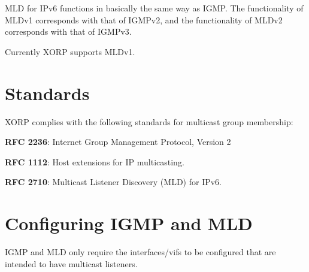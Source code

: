 MLD for IPv6 functions in basically the same way as IGMP.  The
functionality of MLDv1 corresponds with that of IGMPv2, and the
functionality of MLDv2 corresponds with that of IGMPv3.  

Currently XORP supports MLDv1.

\vfill\eject
\section{Standards}
XORP complies with the following standards for multicast group membership:
\begin{description}
\item{\bf RFC 2236}: Internet Group Management Protocol, Version 2
\item{\bf RFC 1112}: Host extensions for IP multicasting.
\item{\bf RFC 2710}: Multicast Listener Discovery (MLD) for IPv6.
\end{description}

\section{Configuring IGMP and MLD}

IGMP and MLD only require the interfaces/vifs to be configured that
are intended to have multicast listeners.

